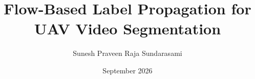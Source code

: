 \documentclass[rnd]{mas_report}
\author{Sunesh Praveen Raja Sundarasami}
\title{Flow-Based Label Propagation for UAV Video Segmentation}
\date{September 2026}
\begin{document}
\frontmatter

\maketitle

\cleardoublepage
{}

\pagestyle{plain}
\cleardoublepage
\statementpage




\tableofcontents


\mainmatter %

\pagestyle{mainmatter}








\begin{appendices}
    
\end{appendices}

\backmatter



\end{document}
